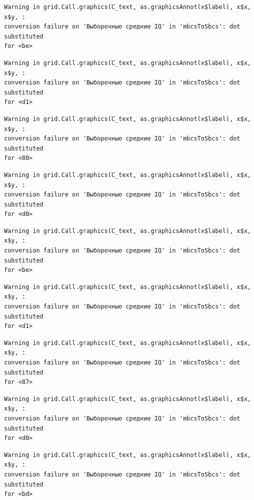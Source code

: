 \documentclass[
  letterpaper,
  DIV=11,
  numbers=noendperiod]{scrreprt}
\theoremstyle{definition}
\theoremstyle{remark}
\begin{document}
\begin{verbatim}
Warning in grid.Call.graphics(C_text, as.graphicsAnnot(x$label), x$x, x$y, :
conversion failure on 'Выборочные средние IQ' in 'mbcsToSbcs': dot substituted
for <be>
\end{verbatim}

\begin{verbatim}
Warning in grid.Call.graphics(C_text, as.graphicsAnnot(x$label), x$x, x$y, :
conversion failure on 'Выборочные средние IQ' in 'mbcsToSbcs': dot substituted
for <d1>
\end{verbatim}

\begin{verbatim}
Warning in grid.Call.graphics(C_text, as.graphicsAnnot(x$label), x$x, x$y, :
conversion failure on 'Выборочные средние IQ' in 'mbcsToSbcs': dot substituted
for <80>
\end{verbatim}

\begin{verbatim}
Warning in grid.Call.graphics(C_text, as.graphicsAnnot(x$label), x$x, x$y, :
conversion failure on 'Выборочные средние IQ' in 'mbcsToSbcs': dot substituted
for <d0>
\end{verbatim}

\begin{verbatim}
Warning in grid.Call.graphics(C_text, as.graphicsAnnot(x$label), x$x, x$y, :
conversion failure on 'Выборочные средние IQ' in 'mbcsToSbcs': dot substituted
for <be>
\end{verbatim}

\begin{verbatim}
Warning in grid.Call.graphics(C_text, as.graphicsAnnot(x$label), x$x, x$y, :
conversion failure on 'Выборочные средние IQ' in 'mbcsToSbcs': dot substituted
for <d1>
\end{verbatim}

\begin{verbatim}
Warning in grid.Call.graphics(C_text, as.graphicsAnnot(x$label), x$x, x$y, :
conversion failure on 'Выборочные средние IQ' in 'mbcsToSbcs': dot substituted
for <87>
\end{verbatim}

\begin{verbatim}
Warning in grid.Call.graphics(C_text, as.graphicsAnnot(x$label), x$x, x$y, :
conversion failure on 'Выборочные средние IQ' in 'mbcsToSbcs': dot substituted
for <d0>
\end{verbatim}

\begin{verbatim}
Warning in grid.Call.graphics(C_text, as.graphicsAnnot(x$label), x$x, x$y, :
conversion failure on 'Выборочные средние IQ' in 'mbcsToSbcs': dot substituted
for <bd>
\end{verbatim}
\end{document}
